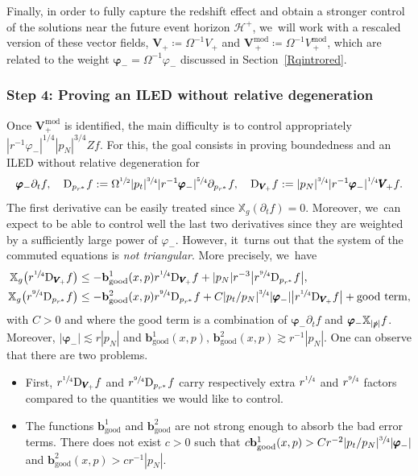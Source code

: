 \documentclass[10pt]{amsart}
\theoremstyle{plain}
\theoremstyle{definition}
\newcommand\T{{\mathbb{X}}}
\begin{document}
Finally, in order to fully capture the redshift effect and obtain a stronger control of the solutions near the future event horizon $\mathcal{H}^+$, we~will work with a rescaled version of these vector fields, $\pmb{V}_{\! +}\coloneqq\Omega^{-1}V_+$ and $\pmb{V}_{\, +}^{ \mathrm{mod}}\coloneqq \Omega^{-1}V_{\, +}^{ \mathrm{mod}}$, which are related to the weight $\pmb{\varphi}_-=\Omega^{-1} \varphi_-$ discussed in Section~\ref{Rqintrored}.

\subsubsection{Step 4: Proving an ILED without relative degeneration}

Once $\pmb{V}_+^{ \mathrm{mod}}$ is identified, the main difficulty is to control appropriately $|r^{-1}\varphi_-|^{1/4}|p_N|^{3/4} Z f $. For this, the goal consists in proving boundedness and an ILED without relative degeneration for
\[
\pmb{\varphi}_- \partial_t f, \quad \mathrm{D}_{p_{r^*}}f:= \Omega^{\sfrac{1}{2}}|p_t|^{\sfrac{3}{4}} |r^{-1} \pmb{\varphi}_-|^{\sfrac{5}{4}} \partial_{p_{r^*}} f, \quad \mathrm{D}_{\pmb{V}_{\! +}}f:=|p_N|^{\sfrac{3}{4}} |r^{-1} \pmb{\varphi}_-|^{\sfrac{1}{4}} \pmb{V}_{\! +} f.
\]
The first derivative can be easily treated since $\T_g(\partial_t f)=0$. Moreover, we~can expect to be able to control well the last two derivatives since they are weighted by a sufficiently large power of $\varphi_-$. However, it~turns out that the system of the commuted equations is \textit{not triangular}. More precisely, we~have
\begin{align*}
\T_g \bigl(r^{\sfrac{1}{4}} \mathrm{D}_{\pmb{V}_{\!+}} f \bigr) & \leq - \mathbf{b}_{\mathrm{good}}^1(x,p) r^{\sfrac{1}{4}}\mathrm{D}_{\pmb{V}_{\!+}} f + |p_N|r^{-3} \big|r^{\sfrac{9}{4}} \mathrm{D}_{p_{r^*}}f \big|, \\
\T_g \bigl(r^{\sfrac{9}{4}} \mathrm{D}_{p_{r^*}}f \bigr)& \leq -\mathbf{b}_{\mathrm{good}}^2(x,p) r^{\sfrac{9}{4}} \mathrm{D}_{p_{r^*}}f +C|p_t/p_N|^{\sfrac{3}{4}}|\pmb{\varphi}_-| \big|r^{\sfrac{1}{4}} \mathrm{D}_{\pmb{V}_{\!+}} f \big| +\textrm{good term},
\end{align*}
with $C>0$ and where the good term is a combination of $\pmb{\varphi}_- \partial_t f$ and $\pmb{\varphi}_- \T_{|\slashed{p}|}f$. Moreover, $|\pmb{\varphi}_-| \lesssim r|p_N|$ and $\mathbf{b}_{\mathrm{good}}^1(x,p), \,\mathbf{b}_{\mathrm{good}}^2(x,p) \gtrsim r^{-1}|p_N|$. One can observe that there are two problems.
\begin{itemize}
\item First, $r^{\sfrac{1}{4}} \mathrm{D}_{\pmb{V}_{\!+}} f$ and $r^{\sfrac{9}{4}} \mathrm{D}_{p_{r^*}}f$ carry respectively extra $r^{\sfrac{1}{4}}$ and $r^{\sfrac{9}{4}}$ factors compared to the quantities we would like to control.
\item The functions $\mathbf{b}_{\mathrm{good}}^1$ and $\mathbf{b}_{\mathrm{good}}^2$ are not strong enough to absorb the bad error terms. There does not exist $c>0$ such that $ c\mathbf{b}_{\mathrm{good}}^1(x,p) > Cr^{-2 }|p_t/p_N|^{\sfrac{3}{4}}|\pmb{\varphi}_-|$ and $ \mathbf{b}_{\mathrm{good}}^2(x,p) > c r^{-1} |p_N|$.
\end{itemize}
\end{document}

